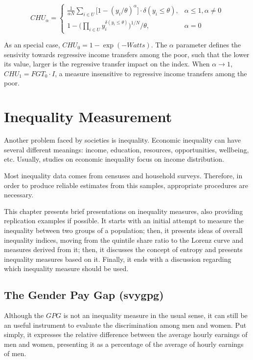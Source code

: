 \documentclass[]{book}
\begin{document}
\[
CHU_\alpha = \begin{cases}
    \frac{1}{\alpha N} \sum_{i \in U} \big[ 1-(y_i/\theta)^\alpha \big] \cdot \delta ( y_i \leqslant \theta ) , & \alpha \leqslant 1 , \alpha \neq 0 \\
    1 - \bigg( \prod_{i \in U} y_i^{\delta ( y_i \leqslant \theta )} \bigg)^{1/N} \bigg/ \theta , &  \alpha = 0
\end{cases}
\]

As an special case, \(CHU_0 = 1 - \exp{(-Watts)}\). The \(\alpha\) parameter defines the sensivity towards regressive income transfers among the poor, such that the lower its value, larger is the regressive transfer impact on the index. When \(\alpha \rightarrow 1\), \(CHU_1 = FGT_0 \cdot I\), a measure insensitive to regressive income transfers among the poor.

\hypertarget{inequality}{%
\chapter{Inequality Measurement}\label{inequality}}

Another problem faced by societies is inequality. Economic inequality can have several different meanings: income, education, resources, opportunities, wellbeing, etc. Usually, studies on economic inequality focus on income distribution.

Most inequality data comes from censuses and household surveys. Therefore, in order to produce reliable estimates from this samples, appropriate procedures are necessary.

This chapter presents brief presentations on inequality measures, also providing replication examples if possible. It starts with an initial attempt to measure the inequality between two groups of a population; then, it presents ideas of overall inequality indices, moving from the quintile share ratio to the Lorenz curve and measures derived from it; then, it discusses the concept of entropy and presents inequality measures based on it. Finally, it ends with a discussion regarding which inequality measure should be used.

\hypertarget{the-gender-pay-gap-svygpg}{%
\section{The Gender Pay Gap (svygpg)}\label{the-gender-pay-gap-svygpg}}

Although the \(GPG\) is not an inequality measure in the usual sense, it can still be an useful instrument to evaluate the discrimination among men and women. Put simply, it expresses the relative difference between the average hourly earnings of men and women, presenting it as a percentage of the average of hourly earnings of men.
\end{document}
